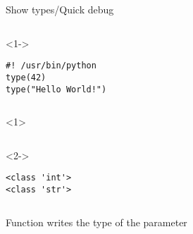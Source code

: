 \begin{frame}[fragile]{Show types/Quick debug}

  \begin{columns}[onlytextwidth]
    \begin{column}{\textwidth}
      \begin{onlyenv}<1->
        \begin{lstlisting}[style=python,title={types1.py}]
#! /usr/bin/python
type(42)
type("Hello World!") \end{lstlisting}
      \end{onlyenv}
    \end{column}
  \end{columns}

    \begin{columns}[onlytextwidth]
    \begin{column}{\textwidth}
      \begin{onlyenv}<1>
        \begin{lstlisting}[style=sh]
%*\LSTPrompt*) python types1.py

       \end{lstlisting}
      \end{onlyenv}

      \begin{onlyenv}<2->
        \begin{lstlisting}[style=sh]
%*\LSTPrompt*) python types1.py
<class 'int'>
<class 'str'> \end{lstlisting}
      \end{onlyenv}
    \end{column}
  \end{columns}

   Function  writes the type of the parameter
\end{frame}


